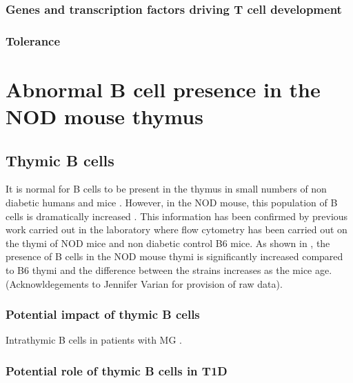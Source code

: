\subsubsection{Genes and transcription factors driving T cell development}
\subsubsection{Tolerance}

\section{Abnormal B cell presence in the NOD mouse thymus}
\subsection{Thymic B cells}

It is normal for B cells to be present in the thymus in small numbers \citep{Isaacson1987, Akashi2000} of non diabetic humans \citep{Isaacson1987} and mice \citep{Akashi2000}. 
However, in the NOD mouse, this population of B cells is dramatically increased \citep{OReilly1994}.
This information has been confirmed by previous work carried out in the laboratory where flow cytometry has been carried out on the thymi of NOD mice and non diabetic control B6 mice.
As shown in , the presence of B cells in the NOD mouse thymi is significantly increased compared to B6 thymi and the difference between the strains increases as the mice age. (Acknowldegements to Jennifer Varian for provision of raw data). 

\subsubsection{Potential impact of thymic B cells}

Intrathymic B cells in patients with MG \citep{Christensson1998}.

\subsubsection{Potential role of thymic B cells in T1D}


































